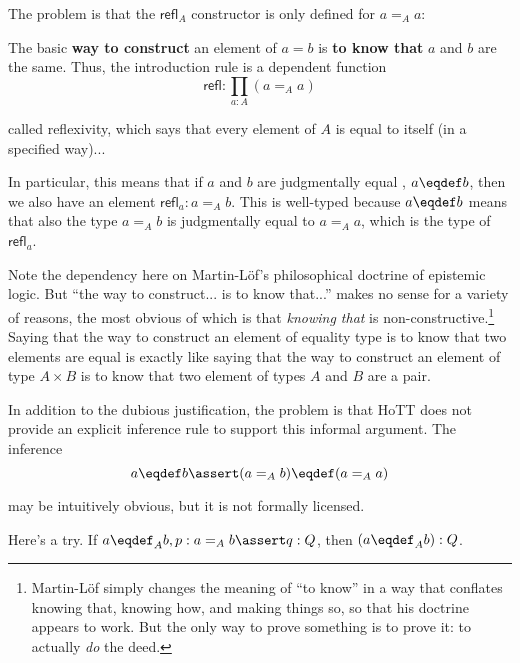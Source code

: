 \documentclass{article}
\begin{document}
The problem is that the
\(\textsf{refl}_A\) constructor is only defined for \(a=_A a\):

\begin{displayquote}
    The basic \textbf{way to construct} an element of \(a=b\) is
    \textbf{to know that} \(a\) and \(b\) are the same. Thus, the
    introduction rule is a dependent function
  \[\textsf{refl} : ∏_{a:A}(a=_A a)\]

  called reflexivity, which says that every element of \(A\) is equal
  to itself (in a specified way)...

  In particular, this means that if \(a\) and \(b\) are judgmentally
  equal {}, \(a\defn b\), then we also
  have an element \(\textsf{refl}_a : a=_A b\). This is well-typed
  because \(a\defn b\) means that also the type \(a=_A b\) is
  judgmentally equal {} to \(a=_A a\),
    which is the type of \(\textsf{refl}_a\).
\end{displayquote}

Note the dependency here on Martin-Löf's philosophical doctrine of
epistemic logic. But ``the way to construct... is to know that...''
makes no sense for a variety of reasons, the most obvious of which is
that \textit{knowing that} is non-constructive.\footnote{Martin-Löf
simply changes the meaning of ``to know'' in a way that conflates
knowing that, knowing how, and making things so, so that his doctrine
appears to work. But the only way to prove something is to prove it:
to actually \textit{do} the deed.} Saying that the way to construct an
element of equality type is to know that two elements are equal is
exactly like saying that the way to construct an element of type
\(A\times B\) is to know that two element of types \(A\) and \(B\) are
a pair.

In addition to the dubious justification, the problem is that HoTT
does not provide an explicit inference rule to support this informal
argument. The inference
\[a\defn b \linfer (a=_A b) \defn (a=_A a)\]

may be intuitively obvious, but it is not formally licensed.

Here's a try. If \(a\defn_A b, p:a=_A b \linfer q:Q\), then \((a\defn_A b):Q\).

\end{document}
